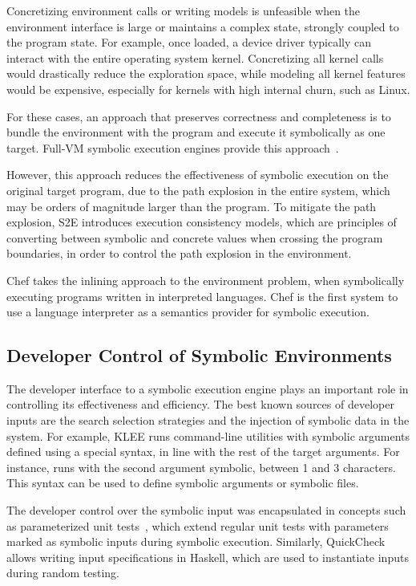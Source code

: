Concretizing environment calls or writing models is unfeasible when the environment interface is large or maintains a complex state, strongly coupled to the program state.
%
For example, once loaded, a device driver typically can interact with the entire operating system kernel.  Concretizing all kernel calls would drastically reduce the exploration space, while modeling all kernel features would be expensive, especially for kernels with high internal churn, such as Linux.

For these cases, an approach that preserves correctness and completeness is to bundle the environment with the program and execute it symbolically as one target.
%
Full-VM symbolic execution engines provide this approach~\cite{s2e,bitBlaze}.

However, this approach reduces the effectiveness of symbolic execution on the original target program, due to the path explosion in the entire system, which may be orders of magnitude larger than the program.
%
To mitigate the path explosion, S2E introduces execution consistency models, which are principles of converting between symbolic and concrete values when crossing the program boundaries, in order to control the path explosion in the environment.

Chef takes the inlining approach to the environment problem, when symbolically executing programs written in interpreted languages.  Chef is the first system to use a language interpreter as a semantics provider for symbolic execution.


\subsection{Developer Control of Symbolic Environments}

The developer interface to a symbolic execution engine plays an important role in controlling its effectiveness and efficiency.
%
The best known sources of developer inputs are the search selection strategies and the injection of symbolic data in the system.
%
For example, KLEE runs command-line utilities with symbolic arguments defined using a special syntax, in line with the rest of the target arguments.  For instance,  runs  with the second argument symbolic, between 1 and 3 characters.  This syntax can be used to define symbolic arguments or symbolic files.

The developer control over the symbolic input was encapsulated in concepts such as parameterized unit tests~\cite{tillmann-puts}, which extend regular unit tests with parameters marked as symbolic inputs during symbolic execution.
%
Similarly, QuickCheck~\cite{quickcheck} allows writing input specifications in Haskell, which are used to instantiate inputs during random testing.

